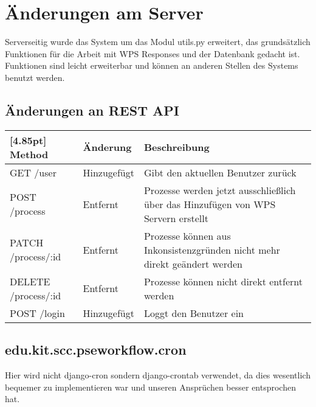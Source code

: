     \section{Änderungen am Server}
        Serverseitig wurde das System um das Modul utils.py erweitert, das grundsätzlich Funktionen für die Arbeit mit WPS Responses und der Datenbank gedacht ist. Funktionen sind leicht erweiterbar und können an anderen Stellen des Systems benutzt werden. \newline
        
        
        
        \subsection{Änderungen an REST API}
        
		\begin{center}
			\setlength\tabcolsep{5pt}
			\renewcommand{\arraystretch}{1.5}

            \begin{tabularx}{\textwidth}{|l|l|X|}
    			\hline
    			\rowcolor[gray]{0.90}[4.85pt]
    			Method & Änderung & Beschreibung \\ \hline
    			GET /user & Hinzugefügt & Gibt den aktuellen Benutzer zurück \\ \hline
    			POST /process & Entfernt & Prozesse werden jetzt ausschließlich über das Hinzufügen von WPS Servern erstellt \\ \hline
    			PATCH /process/:id & Entfernt & Prozesse können aus Inkonsistenzgründen nicht mehr direkt geändert werden \\ \hline
    			DELETE /process/:id & Entfernt & Prozesse können nicht direkt entfernt werden \\ \hline
    			POST /login & Hinzugefügt & Loggt den Benutzer ein  \\ \hline
    		\end{tabularx}
		\end{center}
	
	
	\newpage
    	\subsection{edu.kit.scc.pseworkflow.cron}
    	Hier wird nicht django-cron sondern django-crontab verwendet, da dies wesentlich bequemer zu implementieren war und unseren Ansprüchen besser  entsprochen hat. \\
    	

